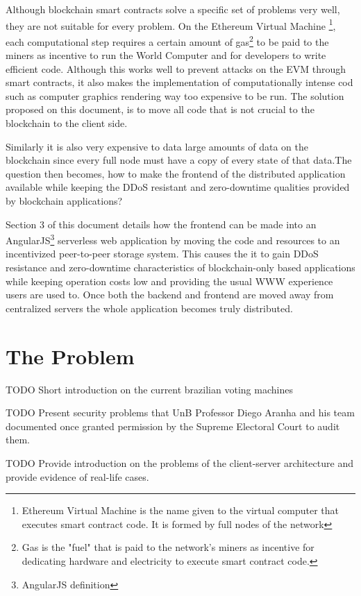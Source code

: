 \documentclass[twoside]{article}
\begin{document}
Although blockchain smart contracts solve a specific set of problems very well, they are not suitable for every problem. On the Ethereum Virtual Machine \footnote{Ethereum Virtual Machine is the name given to the virtual computer that executes smart contract code. It is formed by full nodes of the network}, each computational step requires a certain amount of gas\footnote{Gas is the "fuel" that is paid to the network's miners as incentive for dedicating hardware and electricity to execute smart contract code.} to be paid to the miners as incentive to run the World Computer and for developers to write efficient code. Although this works well to prevent attacks on the EVM through smart contracts, it also makes the implementation of computationally intense cod such as computer graphics rendering way too expensive to be run. The solution proposed on this document, is to move all code that is not crucial to the blockchain to the client side.

Similarly it is also very expensive to data large amounts of data on the blockchain since every full node must have a copy of every state of that data.The question then becomes, how to make the frontend of the distributed application available while keeping the DDoS resistant and zero-downtime qualities provided by blockchain applications?

Section 3 of this document details how the frontend can be made into an AngularJS\footnote{AngularJS definition} serverless web application by moving the code and resources to an incentivized peer-to-peer storage system. This causes the it to gain DDoS resistance and zero-downtime characteristics of blockchain-only based applications while keeping operation costs low and providing the usual WWW experience users are used to. Once both the backend and frontend are moved away from centralized servers the whole application becomes truly distributed.



\section{The Problem}

TODO Short introduction on the current brazilian voting machines

TODO Present security problems that UnB Professor Diego Aranha and his team documented once granted permission by the Supreme Electoral Court to audit them.

TODO Provide introduction on the problems of the client-server architecture and provide evidence of real-life cases.
\end{document}
